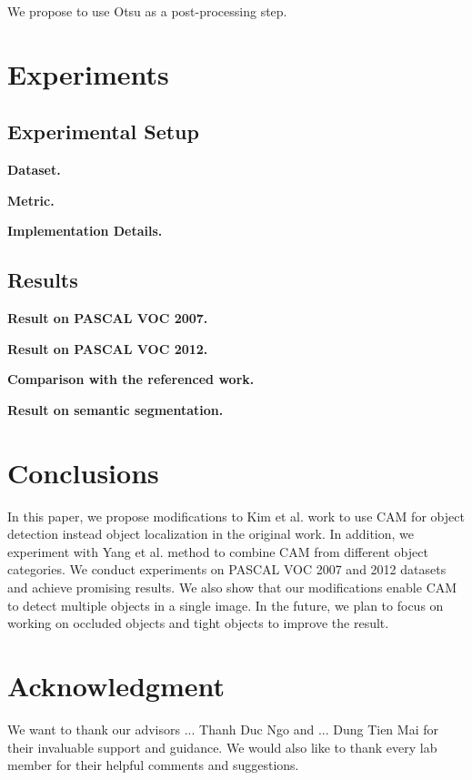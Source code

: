 \documentclass[conference]{IEEEtran}
\begin{document}
We propose to use Otsu as a post-processing step.


\section{Experiments}
\subsection{Experimental Setup}
\textbf{Dataset.}

\textbf{Metric.}

\textbf{Implementation Details.}

\subsection{Results}
\textbf{Result on PASCAL VOC 2007.}

\textbf{Result on PASCAL VOC 2012.}

\textbf{Comparison with the referenced work.}

\textbf{Result on semantic segmentation.}


\section{Conclusions}
In this paper, we propose modifications to Kim et al. \cite{kim2022bridging} work to use CAM for object detection instead object localization in the original work. In addition, we experiment with Yang et al. \cite{yang2019combinational} method to combine CAM from different object categories. We conduct experiments on PASCAL VOC 2007 and 2012 datasets and achieve promising results. We also show that our modifications enable CAM to detect multiple objects in a single image. In the future, we plan to focus on working on occluded objects and tight objects to improve the result.

\section*{Acknowledgment}
We want to thank our advisors ... Thanh Duc Ngo and ... Dung Tien Mai for their invaluable support and guidance. We would also like to thank every lab member for their helpful comments and suggestions.





\end{document}

